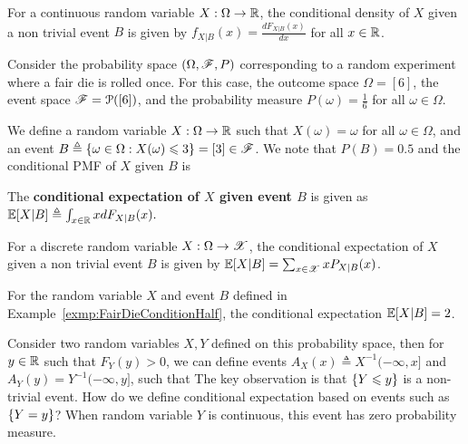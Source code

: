 \documentclass[letterpaper,10pt,english]{article}
\begin{document}
\begin{rem}
For a continuous random variable $X:\Omega\to\mathbb{R}$, the conditional density of $X$ given a non trivial event $B$ is given by $f_{X|B}(x) = \frac{dF_{X|B}(x)}{dx}$ for all $x \in \mathbb{R}$. 
\end{rem}
\begin{shaded}
\begin{exmp} 
\label{exmp:FairDieConditionHalf}
Consider the probability space $(\Omega, \mathscr{F}, P)$ corresponding to a random experiment where a fair die is rolled once. 
For this case, the outcome space $\Omega = [6]$, the event space $\mathscr{F} = \mathcal{P}([6])$, and the probability measure $P(\omega) = \frac{1}{6}$ for all $\omega\in \Omega$. 

We define a random variable $X: \Omega\to\mathbb{R}$ such that $X(\omega) = \omega$ for all $\omega \in \Omega$, 
and an event $B \triangleq \left\{\omega \in \Omega: X(\omega) \leqslant 3\right\} = [3] \in \mathscr{F}$. 
We note that $P(B) = 0.5$ and the conditional %
PMF of $X$ given $B$ is 
\EQ{
P_{X|B}(x) =  \frac 1 3\SetIn{x=3} + \frac 1 3\SetIn{x=2} + \frac 1 3\SetIn{x=1}.
}
\end{exmp}
\end{shaded}

\begin{defn}
The \textbf{conditional expectation of $X$ given event $B$} is given as 
$
\mathbb{E}[X|B] \triangleq \int_{x\in\mathbb{R}}xdF_{X|B}(x).
$
\end{defn}
\begin{rem}
For a discrete random variable $X:\Omega\to\mathscr{X}$, the conditional expectation of $X$ given a non trivial event $B$ is given by $\mathbb{E}[X|B]= \sum_{x\in\mathscr{X}}xP_{X|B}(x)$. 
\end{rem}
\begin{shaded}
\begin{exmp}
For the random variable $X$ and event $B$ defined in Example~\ref{exmp:FairDieConditionHalf}, 
the conditional expectation $\mathbb{E}[X|B] = 2$. 
\end{exmp}
\end{shaded}
\begin{rem}
Consider two random variables $X,Y$ defined on this probability space, 
then for $y \in \mathbb{R}$ such that $F_Y(y) > 0$, we can define events $A_X(x) \triangleq X^{-1}(-\infty, x]$ and $A_Y(y) = Y^{-1}(-\infty, y]$, 
such that 
The key observation is that $\left\{Y \leqslant y\right\}$ is a non-trivial event. 
How do we define conditional expectation based on events such as $\left\{Y = y\right\}$? 
When random variable $Y$ is continuous, this event has zero probability measure. 
\end{rem}
\end{document}
